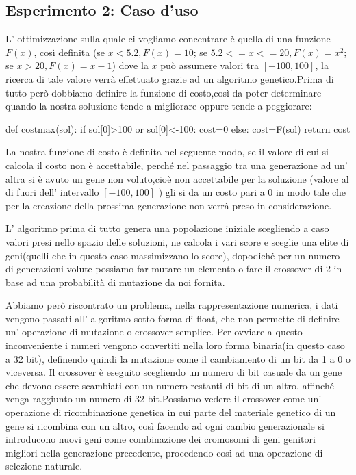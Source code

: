 		\subsection{Esperimento 2: Caso d'uso}
			L' ottimizzazione sulla quale ci vogliamo concentrare è quella di una funzione $F(x)$, così definita (se $x<5.2,F(x)=10$; se $5.2<=x<=20,F(x)=x^2$; se $x>20,F(x)=x-1$) dove la $x$ può assumere valori tra $[-100,100]$, la ricerca di tale valore verrà effettuato grazie ad un algoritmo genetico.Prima di tutto però dobbiamo definire la funzione di costo,così da poter determinare quando la nostra soluzione tende a migliorare oppure tende a peggiorare:
			\begin{python}
		def costmax(sol):
			if sol[0]>100 or sol[0]<-100:
				cost=0
			else:
				cost=F(sol)
		return cost  
			\end{python}
			La nostra funzione di costo è definita nel seguente modo, se il valore di cui si calcola il costo non è accettabile, perché nel passaggio tra una generazione ad un' altra si è avuto un gene non voluto,cioè non accettabile per la soluzione (valore al di fuori dell' intervallo $[-100,100]$ ) gli si da un costo pari a 0 in modo tale che per la creazione della prossima generazione non verrà preso in considerazione.\par
			L' algoritmo prima di tutto genera una popolazione iniziale scegliendo a caso valori presi nello spazio delle soluzioni, ne calcola i vari score e sceglie una elite di geni(quelli che in questo caso massimizzano lo score), dopodiché per un numero di generazioni volute possiamo far mutare un elemento o fare il crossover di 2 in base ad una probabilità di mutazione da noi fornita. \par 
			Abbiamo però riscontrato un problema, nella rappresentazione numerica, i dati vengono passati all' algoritmo sotto forma di float, che non permette di definire un' operazione di mutazione o crossover semplice. Per ovviare a questo inconveniente i numeri vengono convertiti nella loro forma binaria(in questo caso a 32 bit), definendo quindi la mutazione come il cambiamento di un bit da 1 a 0 o viceversa. Il crossover è eseguito scegliendo un numero di bit casuale da un gene che devono essere scambiati con un numero restanti di bit di un altro, affinché venga raggiunto un numero di 32 bit.Possiamo vedere il crossover come un' operazione di ricombinazione genetica in cui parte del materiale genetico di un gene si ricombina con un altro, così facendo ad ogni cambio generazionale si introducono nuovi geni come combinazione dei cromosomi di geni genitori migliori nella generazione precedente, procedendo così ad una operazione di selezione naturale.
